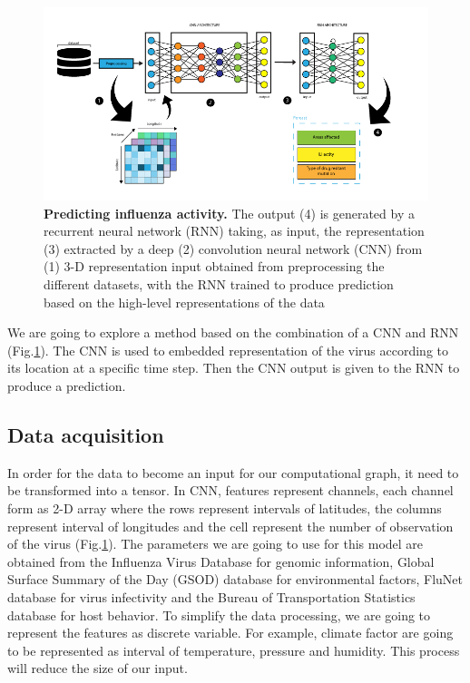 \documentclass[12pt]{article}
\begin{document}
\begin{figure}[h]
    \centering
    \includegraphics[width=\textwidth]{figure-1.png}
    \caption{\textbf{Predicting influenza activity.}  The output (4) is generated by a recurrent neural network (RNN) taking, as input, the representation  (3)  extracted by a deep (2) convolution neural network (CNN) from  (1) 3-D representation input obtained from preprocessing the different datasets, with the RNN trained to produce prediction based on the high-level representations of the data}
    \label{fig:model}
\end{figure}

We are going to explore a method based on the combination of a CNN and RNN (Fig.\ref{fig:model}). The CNN is used to embedded representation of the virus according to its location at a specific time step. Then the CNN output is given to the RNN to produce a prediction. 


\subsection{Data acquisition}
 In order for the data to become an input for our computational graph, it need to be transformed into a tensor. In CNN, features represent channels, each channel form as 2-D array where the rows represent intervals of latitudes, the columns represent interval of longitudes and the cell represent the number of observation of the virus (Fig.\ref{fig:model}). The parameters we are going to use for this model are obtained from the Influenza Virus Database\autocite{chang2006influenza} for genomic information, Global Surface Summary of the Day (GSOD)\autocite{Lott1998} database for environmental factors, FluNet database\autocite{flahault1998} for virus infectivity and the Bureau of Transportation Statistics database\autocite{mcdonald2013} for host behavior. To simplify the data processing, we are going to represent the features as discrete variable. For example, climate factor are going to be represented as interval of temperature, pressure and humidity. This process will reduce the size of our input.
 
\end{document}

